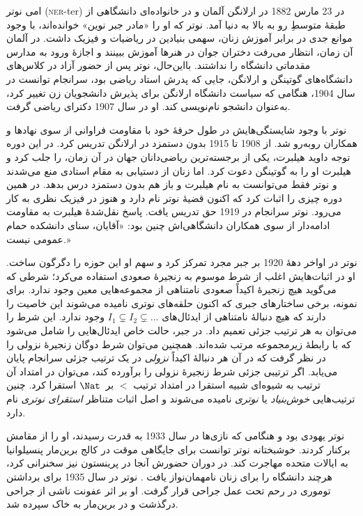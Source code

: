 \documentclass[../../../include/open-logic-section]{subfiles}
\begin{document}



امی نوتر (\textsc{ner}-ter) در 23 مارس 1882 در ارلانگن آلمان و در
خانواده‌ای دانشگاهی از طبقهٔ متوسطِ رو به بالا به دنیا آمد. نوتر که او
را «مادر جبر نوین» خوانده‌اند، با وجود موانع جدی در برابر آموزش زنان،
سهمی بنیادین در ریاضیات و فیزیک داشت. در آلمان آن زمان، انتظار می‌رفت
دختران جوان در هنرها آموزش ببینند و اجازهٔ ورود به مدارس مقدماتی
دانشگاه را نداشتند. بااین‌حال، نوتر پس از حضور آزاد در کلاس‌های
دانشگاه‌های گوتینگن و ارلانگن، جایی که پدرش استاد ریاضی بود، سرانجام
توانست در سال 1904، هنگامی که سیاست دانشگاه ارلانگن برای پذیرش
دانشجویان زن تغییر کرد، به‌عنوان دانشجو نام‌نویسی کند. او در سال 1907
دکترای ریاضی گرفت.

نوتر با وجود شایستگی‌هایش در طول حرفهٔ خود با مقاومت فراوانی از سوی
نهادها و همکاران روبه‌رو شد. از 1908 تا 1915 بدون دستمزد در ارلانگن
تدریس کرد. در این دوره توجه داوید هیلبرت، یکی از برجسته‌ترین
ریاضی‌دانان جهان در آن زمان، را جلب کرد و هیلبرت او را به گوتینگن
دعوت کرد. اما زنان از دستیابی به مقام استادی منع می‌شدند و نوتر فقط
می‌توانست به نام هیلبرت و باز هم بدون دستمزد درس بدهد. در همین دوره
چیزی را اثبات کرد که اکنون قضیهٔ نوتر نام دارد و هنوز در فیزیک نظری به
کار می‌رود. نوتر سرانجام در 1919 حق تدریس یافت. پاسخ نقل‌شدهٔ هیلبرت
به مقاومت ادامه‌دار از سوی همکاران دانشگاهی‌اش چنین بود: «آقایان،
سنای دانشکده حمام عمومی نیست.»

نوتر در اواخر دههٔ 1920 بر جبر مجرد تمرکز کرد و سهم او این حوزه را
دگرگون ساخت. او در اثبات‌هایش اغلب از شرط موسوم به زنجیرهٔ صعودی
استفاده می‌کرد؛ شرطی که می‌گوید هیچ زنجیرهٔ اکیداً صعودی نامتناهی از
مجموعه‌هایی معین وجود ندارد. برای نمونه، برخی ساختارهای جبری که اکنون
حلقه‌های نوتری نامیده می‌شوند این خاصیت را دارند که هیچ دنبالهٔ
نامتناهی از ایدئال‌های
$I_1 \subsetneq I_2 \subsetneq \dots$ وجود ندارد. این شرط را می‌توان
به هر ترتیب جزئی تعمیم داد. در جبر، حالت خاص ایدئال‌هایی را شامل می‌شود
که با رابطهٔ زیرمجموعه مرتب شده‌اند. همچنین می‌توان شرط دوگان زنجیرهٔ
نزولی را در نظر گرفت که در آن هر دنبالهٔ اکیداً \emph{نزولی} در یک
ترتیب جزئی سرانجام پایان می‌یابد. اگر ترتیبی جزئی شرط زنجیرهٔ نزولی را
برآورده کند، می‌توان در امتداد آن ترتیب به شیوه‌ای شبیه استقرا در
امتداد ترتیب $<$ بر~$\Nat$ استقرا کرد. چنین ترتیب‌هایی
\emph{خوش‌بنیاد} یا \emph{نوتری} نامیده می‌شوند و اصل اثبات متناظر
\emph{استقرای نوتری} نام دارد.

نوتر یهودی بود و هنگامی که نازی‌ها در سال 1933 به قدرت رسیدند، او را
از مقامش برکنار کردند. خوشبختانه نوتر توانست برای جایگاهی موقت در کالج
برین‌مار پنسیلوانیا به ایالات متحده مهاجرت کند. در دوران حضورش آنجا در
پرینستون نیز سخنرانی کرد، هرچند دانشگاه را برای زنان نامهمان‌نواز یافت
\citep[81]{Dick1981}. نوتر در سال 1935 برای برداشتن توموری در رحم تحت
عمل جراحی قرار گرفت. او بر اثر عفونت ناشی از جراحی درگذشت و در برین‌مار
به خاک سپرده شد.
\end{document}
